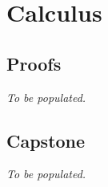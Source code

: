 \chapter{Calculus}

\clearpage

\clearpage

\section*{Proofs}
\textit{To be populated.}

\section*{Capstone}
\textit{To be populated.}

